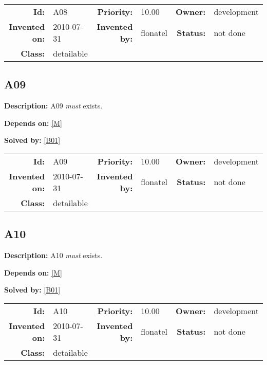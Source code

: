 \par
{\small \begin{center}\begin{tabular}{rlrlrl}
\textbf{Id:} & A08  & \textbf{Priority:} & 10.00  & \textbf{Owner:} & development\\ 
\textbf{Invented on:} & 2010-07-31  & \textbf{Invented by:} & flonatel  & \textbf{Status:} & not done \\ 
\textbf{Class:} & detailable  & & & \end{tabular}\end{center} }

\subsection{A09}\label{A09}
\textbf{Description:} A09 \textsl{must} exists.

\textbf{Depends on:} \ref{M} 

\textbf{Solved by:} \ref{B01} 

\par
{\small \begin{center}\begin{tabular}{rlrlrl}
\textbf{Id:} & A09  & \textbf{Priority:} & 10.00  & \textbf{Owner:} & development\\ 
\textbf{Invented on:} & 2010-07-31  & \textbf{Invented by:} & flonatel  & \textbf{Status:} & not done \\ 
\textbf{Class:} & detailable  & & & \end{tabular}\end{center} }

\subsection{A10}\label{A10}
\textbf{Description:} A10 \textsl{must} exists.

\textbf{Depends on:} \ref{M} 

\textbf{Solved by:} \ref{B01} 

\par
{\small \begin{center}\begin{tabular}{rlrlrl}
\textbf{Id:} & A10  & \textbf{Priority:} & 10.00  & \textbf{Owner:} & development\\ 
\textbf{Invented on:} & 2010-07-31  & \textbf{Invented by:} & flonatel  & \textbf{Status:} & not done \\ 
\textbf{Class:} & detailable  & & & \end{tabular}\end{center} }

